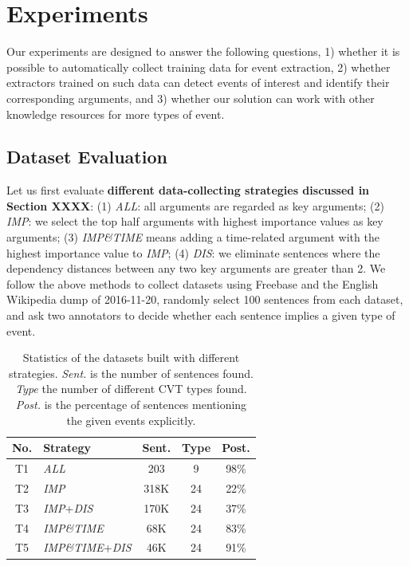 \section{Experiments}
Our experiments are designed to answer the following questions, 
1) whether it is possible to automatically collect training data for event extraction, 
2) whether  extractors trained on such data can detect events of interest and identify
their corresponding arguments,
and 3) whether our solution can work with other knowledge resources for more types of event. 

 \subsection{Dataset Evaluation}\label{sec:evalhypo}
Let us first evaluate \textbf{different data-collecting strategies discussed in Section XXXX}:
(1) \emph{ALL}: all arguments are regarded as key arguments; (2) \emph{IMP}: we select the top half arguments with highest importance values as key arguments; (3) \emph{IMP\&TIME} means adding a time-related argument with the highest importance value to %
\emph{IMP}; (4) \emph{DIS}: we eliminate sentences where the dependency distances between any two key arguments are greater than 2. 
We follow the above methods to collect datasets using Freebase and the English Wikipedia dump of 2016-11-20, 
randomly select 100 sentences from each dataset, and ask two annotators to decide whether each sentence implies a given type of event.




\begin{table}[h]
\small
\centering
\begin{tabular}{|c|l|c|c|c|} \hline
	No. & Strategy & Sent. & Type & Post. \\ \hline
	T1 & \emph{ALL} & 203 & 9 & 98\% \\ \hline
	T2 & \emph{IMP} & 318K & 24 & 22\% \\ \hline
	T3 & \emph{IMP}+\emph{DIS} & 170K & 24 & 37\% \\ \hline
	T4 & \emph{IMP\&TIME} & 68K & 24 & 83\% \\ \hline
	T5 & \emph{IMP\&TIME}+\emph{DIS} & 46K & 24 & 91\% \\ \hline
\end{tabular}
\caption{Statistics of the datasets built with different strategies. 
\textit{Sent.} is the number of sentences found. \textit{Type} the number of different CVT types found.  \textit{Post.} is the percentage of sentences mentioning the given events explicitly.\label{tab:3}}
\end{table}

